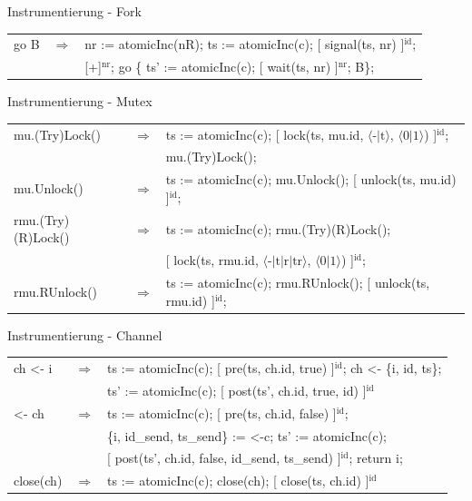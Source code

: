 \documentclass[aspectratio=169]{beamer}  %
\begin{document}
\begin{frame}{Instrumentierung - Fork}
  \begin{tabular}{lcl}
    go B & $\Rightarrow$ & nr := atomicInc(nR); ts := atomicInc(c); [ signal(ts, nr) ]$^\text{id}$;\\
    & & [+]$^\text{nr}$; go \{ ts' := atomicInc(c); [ wait(ts, nr) ]$^\text{nr}$; B\};
  \end{tabular}
\end{frame}

\begin{frame}{Instrumentierung - Mutex}
  \begin{tabular}{lcl}
    mu.(Try)Lock() & $\Rightarrow$ & ts := atomicInc(c);
    [ lock(ts, mu.id, $\langle \text{-|t}\rangle$, $\langle \text{0|1}\rangle$) ]$^\text{id}$;\\
    & & mu.(Try)Lock();\\
  mu.Unlock() & $\Rightarrow$ & ts := atomicInc(c); mu.Unlock(); [ unlock(ts, mu.id) ]$^\text{id}$;\\
  rmu.(Try)(R)Lock() & $\Rightarrow$ & ts := atomicInc(c); rmu.(Try)(R)Lock();\\
    & & [ lock(ts, rmu.id, $\langle \text{-|t|r|tr}\rangle$, $\langle \text{0|1}\rangle$) ]$^\text{id}$;\\
  rmu.RUnlock() & $\Rightarrow$ & ts := atomicInc(c); rmu.RUnlock(); [ unlock(ts, rmu.id) ]$^\text{id}$;
  \end{tabular}  
\end{frame}

\begin{frame}{Instrumentierung - Channel}
  \begin{tabular}{lcl}
  ch <- i & $\Rightarrow$ & ts := atomicInc(c); [ pre(ts, ch.id, true) ]$^\text{id}$; ch <- \{i, id, ts\};\\
    & & ts' := atomicInc(c); [ post(ts', ch.id, true, id) ]$^\text{id}$\\
  <- ch & $\Rightarrow$ & ts := atomicInc(c); [ pre(ts, ch.id, false) ]$^\text{id}$;\\
    & & \{i, id\_send, ts\_send\} := <-c; ts' := atomicInc(c);\\
    & & [ post(ts', ch.id, false, id\_send, ts\_send) ]$^\text{id}$; return i;\\
  close(ch) & $\Rightarrow$ & ts := atomicInc(c); close(ch); [ close(ts, ch.id) ]$^\text{id}$
  \end{tabular}
\end{frame}
\end{document}
